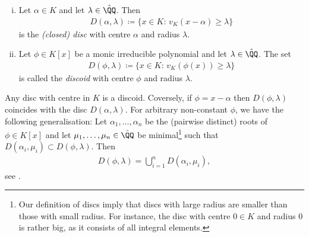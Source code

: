 \begin{definition}
    \begin{enumerate}[(i)]
        \item Let $\alpha \in K$ and let $\lambda \in \hat{\QQ}$. 
            Then
                \begin{align}
                    D(\alpha, \lambda) \coloneqq \lbrace x \in K:\, v_K(x - \alpha) \geq \lambda\rbrace
                \end{align}
            is the \textit{(closed) disc} with centre $\alpha$ and radius $\lambda$.
        \item Let $\phi \in K[x]$ be a monic irreducible polynomial and let $\lambda \in \hat{\QQ}$.
            The set 
            \begin{align}
                D(\phi, \lambda) \coloneqq \lbrace x \in K:\, v_K(\phi(x)) \geq \lambda \rbrace
            \end{align}
            is called the \textit{discoid} with centre $\phi$ and radius $\lambda$.
    \end{enumerate}
\end{definition}

\begin{remark}
    Any disc with centre in $K$ is a discoid.
    Coversely, if $\phi = x - \alpha$ then $D(\phi, \lambda)$ coincides with the disc $D(\alpha, \lambda)$.
    For arbitrary non-constant $\phi$, we have the following generalisation:
    Let $\alpha_1,\dots,\alpha_n$ be the (pairwise distinct) roots of $\phi \in K[x]$
    and let $\mu_1,\dots,\mu_n \in \hat{\QQ}$ be minimal\footnote{
        Our definition of discs imply that discs with large radius are smaller than those with small radius.
        For instance, the disc with centre $0\in K$ and radius $0$ is rather big, as it consists of all integral elements.
    } such that $D(\alpha_i,\mu_i) \subset D(\phi,\lambda)$.
    Then
    \begin{align}
        D(\phi,\lambda) = \bigcup_{i=1}^n D(\alpha_i,\mu_i),
    \end{align}
    see \cite[Lemma 4.43]{Rueth}.
\end{remark}